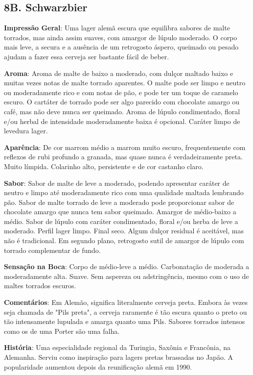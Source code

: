 \subsection*{8B. Schwarzbier}
\textbf{Impressão Geral}: Uma lager alemã escura que equilibra sabores de malte torrados, mas ainda assim suaves, com amargor de lúpulo moderado. O corpo mais leve, a secura e a ausência de um retrogosto áspero, queimado ou pesado ajudam a fazer essa cerveja ser bastante fácil de beber.

\textbf{Aroma}: Aroma de malte de baixo a moderado, com dulçor maltado baixo e muitas vezes notas de malte torrado aparentes. O malte pode ser limpo e neutro ou moderadamente rico e com notas de pão, e pode ter um toque de caramelo escuro. O cartáter de torrado pode ser algo parecido com chocolate amargo ou café, mas não deve nunca ser queimado. Aroma de lúpulo condimentado, floral e/ou herbal de intensidade moderadamente baixa é opcional. Caráter limpo de levedura lager.

\textbf{Aparência}: De cor marrom médio a marrom muito escuro, frequentemente com reflexos de rubi profundo a granada, mas quase nunca é verdadeiramente preta. Muito límpida. Colarinho alto, persistente e de cor castanho claro.

\textbf{Sabor}: Sabor de malte de leve a moderado, podendo apresentar caráter de neutro e limpo até moderadamente rico com uma qualidade maltada lembrando pão. Sabor de malte torrado de leve a moderado pode proporcionar sabor de chocolate amargo que nunca tem sabor queimado. Amargor de médio-baixo a médio. Sabor de lúpulo com caráter condimentado, floral e/ou herba de leve a moderado. Perfil lager limpo. Final seco. Algum dulçor residual é aceitável, mas não é tradicional. Em segundo plano, retrogosto sutil de amargor de lúpulo com torrado complementar de fundo.

\textbf{Sensação na Boca}: Corpo de médio-leve a médio. Carbonatação de moderada a moderadamente alta. Suave. Sem aspereza ou adstringência, mesmo com o uso de maltes torrados escuros.

\textbf{Comentários}: Em Alemão, significa literalmente cerveja preta. Embora às vezes seja chamada de "Pils preta", a cerveja raramente é tão escura quanto o preto ou tão intensamente lupulada e amarga quanto uma Pils. Sabores torrados intensos como os de uma Porter são uma falha.

\textbf{História}: Uma especialidade regional da Turingia, Saxônia e Francônia, na Alemanha. Serviu como inspiração para lagers pretas brassadas no Japão. A popularidade aumentou depois da reunificação alemã em 1990.

